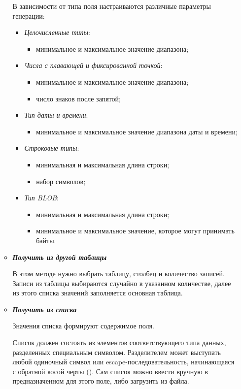 \begin{enumerate}[leftmargin=39pt]
\begin{itemize}[leftmargin=10pt]
	В зависимости от типа поля настраиваются различные параметры генерации:
	\begin{itemize}[leftmargin=5pt]
		\item[] \textit{Целочисленные типы}: 
		\begin{itemize}
			\item минимальное и максимальное значение диапазона;
		\end{itemize}	
		\item[] \textit{Числа с плавающей и фиксированной точкой}:  
		\begin{itemize}
			\item  минимальное и максимальное значение диапазона; 
			\item  число знаков после запятой;
		\end{itemize}		
		\item[] \textit{Тип даты и времени}: 
		\begin{itemize}
			\item  минимальное и максимальное значение диапазона даты и времени;
		\end{itemize}		
		\item[] \textit{Строковые типы}:
		\begin{itemize}
			\item минимальная и максимальная длина строки; 
			\item набор символов;
		\end{itemize}		
		\item[] \textit{Тип BLOB}:  
		\begin{itemize}
			\item  минимальная и максимальная длина строки; 
			\item  минимальное и максимальное значение, которое могут принимать байты.
		\end{itemize}	
	\end{itemize}	
	\item \textbf{\textit{Получить из другой таблицы}}
	
	В этом методе нужно выбрать таблицу, столбец и количество записей. Записи из таблицы выбираются случайно в указанном количестве, далее из этого списка значений заполняется основная таблица. 
	\item \textbf{\textit{Получить из списка}}
	
	Значения списка формируют содержимое поля.
	
	Список должен состоять из элементов соответствующего типа данных, разделенных специальным символом. Разделителем может выступать любой одиночный символ или escape-последовательность, начинающаяся с обратной косой черты (\rr{\textbackslash}). Сам список можно ввести вручную в предназначенном для этого поле, либо загрузить из файла. 


\end{itemize}
\end{enumerate}
